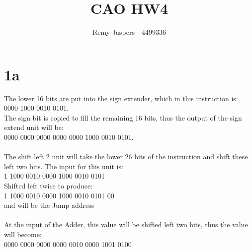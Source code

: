 \documentclass[10pt,a4paper]{article}
\author{Remy Jaspers - 4499336}
\title{CAO HW4}
\begin{document}
	\maketitle
	\section*{1a}
	The lower 16 bits are put into the sign extender, which in this instruction is: \\
	0000 1000 0010 0101. \\
	The sign bit is copied to fill the remaining 16 bits, thus the output of the sign extend unit will be:\\
	0000 0000 0000 0000 0000 1000 0010 0101. \\\\
	The shift left 2 unit will take the lower 26 bits of the instruction and shift these left two bits. The input for this unit is:\\
	1 1000 0010 0000 1000 0010 0101 \\
	Shifted left twice to produce:\\
	1 1000 0010 0000 1000 0010 0101 00\\
	and will be the Jump address \\\\
	At the input of the Adder, this value will be shifted left two bits, thus the value will become:\\
	0000 0000 0000 0000 0010 0000 1001 0100
	
\end{document}
